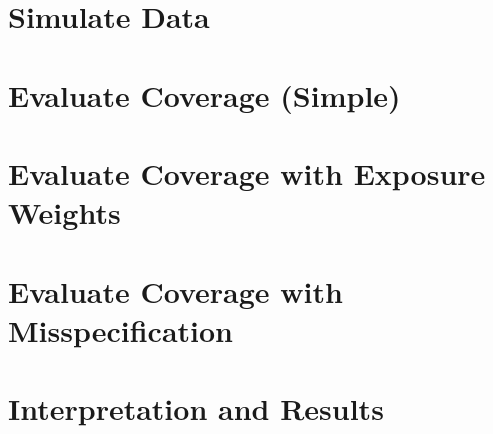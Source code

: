 \documentclass[psamsfonts]{amsart}
\theoremstyle{definition}
\theoremstyle{remark}
\numberwithin{equation}{section}
\begin{document}
\section{Simulate Data}



\section{Evaluate Coverage (Simple)}

\section{Evaluate Coverage with Exposure Weights}

\section{Evaluate Coverage with Misspecification}

\section{Interpretation and Results}
\end{document}
